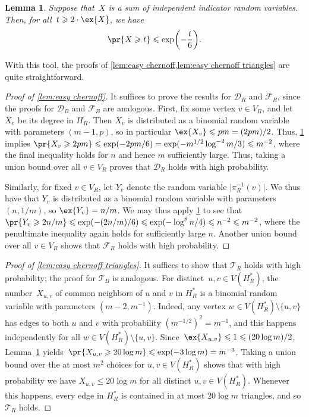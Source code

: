 \documentclass[11pt,reqno,oneside]{amsart}
\newtheorem{lemma}[theorem]{Lemma}
\theoremstyle{definition}
\newcommand\ab[1]{\lvert#1\rvert}
\newcommand\1{\mathbf{1}}
\DeclarePairedDelimiter{\paren}{\lparen}{\rparen}
\let\leq\leqslant
\let\geq\geqslant
\begin{document}
\begin{lemma}\label{lemma: chernoff}
  Suppose that~$X$ is a sum of independent indicator random variables.
  Then, for all~$t\geq 2\cdot \ex{X}$, we have
  \begin{equation*}
    \pr{X\geq t}\leq \exp\paren[\bigg]{-\frac{t}{6}}.
  \end{equation*}
\end{lemma}

With this tool, the proofs of \cref{lem:easy chernoff,lem:easy chernoff triangles} are quite straightforward.


\begin{proof}[Proof of \cref{lem:easy chernoff}]
    It suffices to prove the results for $\mathcal D_R$ and $\mathcal F_R$, since the proofs for $\mathcal D_B$ and $\mathcal F_B$ are analogous. First, fix some vertex $v \in V_R$, and let $X_v$ be its degree in $H_R$. Then $X_v$ is distributed as a binomial random variable with parameters $(m-1,p)$, so in particular $\ex{X_v}\leq pm =(2pm)/2$. Thus, \cref{lemma: chernoff} implies $\pr{X_v \geq 2pm}\leq \exp(-2pm/6) = \exp(-m^{1/2}\log^{-2} m/3)\leq m^{-2}$, where the final inequality holds for $n$ and hence $m$ sufficiently large. Thus, taking a union bound over all $v \in V_R$ proves that $\mathcal D_R$ holds with high probability. 

    Similarly, for fixed $v \in V_R$, let $Y_v$ denote the random variable $\ab{\pi_R^{-1}(v)}$. We thus have that $Y_v$ is distributed as a binomial random variable with parameters $(n,1/m)$, so $\ex{Y_v}=n/m$. We may thus apply \cref{lemma: chernoff} to see that $\pr{Y_v\geq 2n/m} \leq \exp(-(2n/m)/6) \leq \exp(-\log^{8} n/4) \leq n^{-2}\leq m^{-2}$, where the penultimate inequality again holds for sufficiently large $n$. Another union bound over all $v \in V_R$ shows that $\mathcal F_R$ holds with high probability.
\end{proof}

\begin{proof}[Proof of \cref{lem:easy chernoff triangles}]
  It suffices to show that $\mathcal T_R$ holds with high probability; the proof for $\mathcal T_B$ is analogous. For distinct~$u,v\in V(H^*_R)$, the number~$X_{u,v}$ of common neighbors of $u$ and $v$ in $H^*_R$ is a binomial random variable with parameters $(m-2,m^{-1})$. Indeed, any vertex $w\in V(H^*_R)\setminus \{u,v\}$ has edges to both $u$ and $v$ with probability $(m^{-1/2})^2=m^{-1}$, and this happens independently for all $w\in V(H^*_R)\setminus \{u,v\}$. Since~$\ex{X_{u,v}}\leq 1\leq (20 \log m)/2$, Lemma~\ref{lemma: chernoff} yields~$\pr{X_{u,v}\geq 20\log m}\leq\exp(-3\log m)=m^{-3}$. Taking a union bound over the at most $m^2$ choices for $u,v\in V(H^*_R)$ shows that with high probability we have $X_{u,v}\leq 20\log m$ for all distinct $u,v\in V(H^*_R)$. Whenever this happens, every edge in $H^*_R$ is contained in at most $20\log m$ triangles, and so $\mathcal T_R$ holds.
\end{proof}
\end{document}
